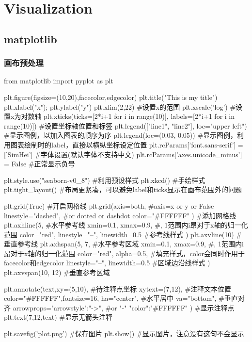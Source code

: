 \section{Visualization}

  \subsection{matplotlib}
    \subsubsection{画布预处理}
      \begin{codeblock}[language=python, caption={basic setup of plt}]
        from matplotlib import pyplot as plt

        plt.figure(figsize=(10,20),facecolor,edgecolor)
        plt.title("This is my title")
        plt.xlabel("x"); plt.ylabel("y")
        plt.xlim(2,22) #设置x的范围
        plt.xscale('log') #设置x为对数轴
        plt.xticks(ticks=[2*i+1 for i in range(10)], 
                   labels=[2*i+1 for i in range(10)]) #设置坐标轴位置和标签
        plt.legend(["line1", "line2"], loc="upper left") #显示图例，以加入图表的顺序为序
        plt.legend(loc=(0.03, 0.05)) #显示图例，利用图表绘制时的label，直接以横纵坐标设定位置
        plt.rcParams['font.sans-serif'] = ['SimHei'] #字体设置(默认字体不支持中文)
        plt.rcParams['axes.unicode_minus'] = False #正常显示负号

        plt.style.use("seaborn-v0_8") #利用预设样式
        plt.xkcd() #手绘样式
        plt.tight_layout() #布局更紧凑，可以避免label和ticks显示在画布范围外的问题

        plt.grid(True) #开启网格线
        plt.grid(axis=both, #axis=x or y or False
                linestyle="dashed", #or dotted or dashdot
                color="#FFFFFF"
        ) #添加网格线
        plt.axhline(5, #水平参考线
                    xmin=0.1, xmax=0.9, #, 1\rbrack 范围内i昂对于x轴的归一化范围
                    color="red", linestyle="--", linewidth=0.5 #参考线样式
        ) 
        plt.axvline(10) #垂直参考线
        plt.axhspan(5, 7, #水平参考区域
                    xmin=0.1, xmax=0.9, #, 1\rbrack 范围内i昂对于x轴的归一化范围
                    color="red", alpha=0.5, #填充样式，color会同时作用于facecolor和edgecolor
                    linestyle="--", linewidth=0.5 #区域边沿线样式
        ) 
        plt.axvspan(10, 12) #垂直参考区域

        plt.annotate(text,xy=(5,10), #待注释点坐标
                    xytext=(7,12), #注释文本位置
                    color="#FFFFFF",fontsize=16,
                    ha="center", #水平居中
                    va="bottom", #垂直对齐
                    arrowprops={"arrowstyle":"->", #or "-"
                                "color":"#FFFFFF"}
        ) #显示注释点
        plt.text(7,12,text) #显示无箭头注释

        plt.savefig('plot.png') #保存图片
        plt.show() #显示图片，注意没有这句不会显示
      \end{codeblock}

